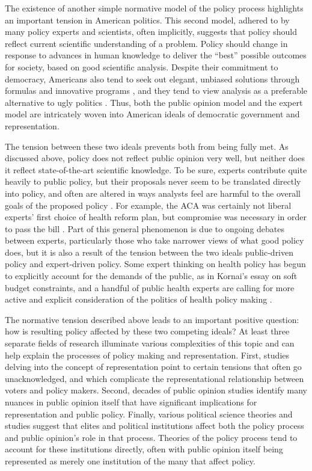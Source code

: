 The existence of another simple normative model of the policy process highlights an important tension in American politics. This second model, adhered to by many policy experts and scientists, often implicitly, suggests that policy should reflect current scientific understanding of a problem. Policy should change in response to advances in human knowledge to deliver the ``best'' possible outcomes for society, based on good scientific analysis. Despite their commitment to democracy, Americans also tend to seek out elegant, unbiased solutions through formulas and innovative programs \citep{Marmor2012b}, and they tend to view analysis as a preferable alternative to ugly politics \citep{Lindblom1965}. Thus, both the public opinion model and the expert model are intricately woven into American ideals of democratic government and representation.

The tension between these two ideals prevents both from being fully met. As discussed above, policy does not reflect public opinion very well, but neither does it reflect state-of-the-art scientific knowledge. To be sure, experts contribute quite heavily to public policy, but their proposals never seem to be translated directly into policy, and often are altered in ways analysts feel are harmful to the overall goals of the proposed policy \citep{Oliver2006,Bernier2011}. For example, the ACA was certainly not liberal experts' first choice of health reform plan, but compromise was necessary in order to pass the bill \citep{Oberlander2010}. Part of this general phenomenon is due to ongoing debates between experts, particularly those who take narrower views of what good policy does, but it is also a result of the tension between the two ideals public-driven policy and expert-driven policy. Some expert thinking on health policy has begun to explicitly account for the demands of the public, as in Kornai's \citeyearpar{Kornai2009} essay on soft budget constraints, and a handful of public health experts are calling for more active and explicit consideration of the politics of health policy making \citep{Oliver2006,Bernier2011,Navarro2008,Lezine2007}.

The normative tension described above leads to an important positive question: how is resulting policy affected by these two competing ideals? At least three separate fields of research illuminate various complexities of this topic and can help explain the processes of policy making and representation. First, studies delving into the concept of representation point to certain tensions that often go unacknowledged, and which complicate the representational relationship between voters and policy makers. Second, decades of public opinion studies identify many nuances in public opinion itself that have significant implications for representation and public policy. Finally, various political science theories and studies suggest that elites and political institutions affect both the policy process and public opinion's role in that process. Theories of the policy process tend to account for these institutions directly, often with public opinion itself being represented as merely one institution of the many that affect policy.


